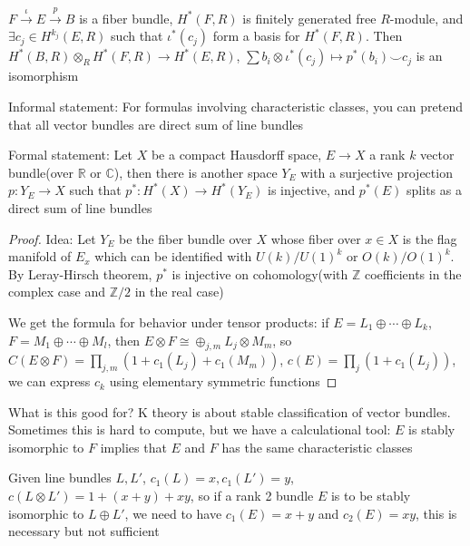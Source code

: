\documentclass[main]{subfiles}
\begin{document}
\begin{theorem}
$F\xrightarrow{\iota}E\xrightarrow{p}B$ is a fiber bundle, $H^*(F,R)$ is finitely generated free $R$-module, and $\exists c_j\in H^{k_j}(E,R)$ such that $\iota^*(c_j)$ form a basis for $H^*(F,R)$. Then $H^*(B,R)\otimes_RH^*(F,R)\to H^*(E,R)$, $\sum b_i\otimes\iota^*(c_j)\mapsto p^*(b_i)\smile c_j$ is an isomorphism
\end{theorem}

\begin{theorem}
Informal statement: For formulas involving characteristic classes, you can pretend that all vector bundles are direct sum of line bundles

Formal statement: Let $X$ be a compact Hausdorff space, $E\to X$ a rank $k$ vector bundle(over $\mathbb R$ or $\mathbb C$), then there is another space $Y_E$ with a surjective projection $p:Y_E\to X$ such that $p^*:H^*(X)\to H^*(Y_E)$ is injective, and $p^*(E)$ splits as a direct sum of line bundles
\end{theorem}

\begin{proof}
Idea: Let $Y_E$ be the fiber bundle over $X$ whose fiber over $x\in X$ is the flag manifold of $E_x$ which can be identified with $U(k)/U(1)^k$ or $O(k)/O(1)^k$. By Leray-Hirsch theorem, $p^*$ is injective on cohomology(with $\mathbb Z$ coefficients in the complex case and $\mathbb Z/2$ in the real case)

We get the formula for behavior under tensor products: if $E=L_1\oplus\cdots\oplus L_k$, $F=M_1\oplus\cdots\oplus M_l$, then $E\otimes F\cong\oplus_{j,m}L_j\otimes M_m$, so $C(E\otimes F)=\prod_{j,m}(1+c_1(L_j)+c_1(M_m))$, $c(E)=\prod_j(1+c_1(L_j))$, we can express $c_k$ using elementary symmetric functions
\end{proof}

What is this good for? K theory is about stable classification of vector bundles. Sometimes this is hard to compute, but  we have a calculational tool: $E$ is stably isomorphic to $F$ implies that $E$ and $F$ has the same characteristic classes

\begin{example}
Given line bundles $L,L'$, $c_1(L)=x,c_1(L')=y$, $c(L\otimes L')=1+(x+y)+xy$, so if a rank 2 bundle $E$ is to be stably isomorphic to $L\oplus L'$, we need to have $c_1(E)=x+y$ and $c_2(E)=xy$, this is necessary but not sufficient
\end{example}
\end{document}
